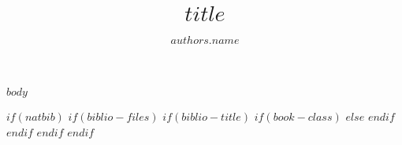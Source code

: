 \documentclass[fleqn,10pt,lineno]{wlpeerj}
\title{$title$}
\author[$authors.affiliation$]{$authors.name$}
\affil[$affiliations.number$]{$affiliations.name$}
\begin{document}
\flushbottom
\maketitle
\thispagestyle{empty}


$body$

$if(natbib)$
  $if(biblio-files)$
    $if(biblio-title)$
      $if(book-class)$
      $else$
      $endif$
    $endif$
  $endif$
$endif$


\end{document}
